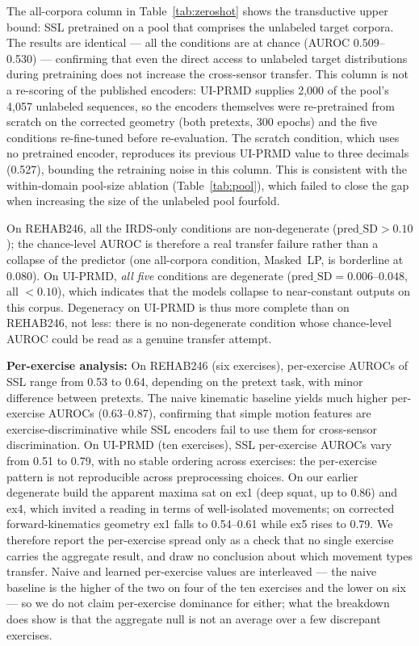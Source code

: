\documentclass[10pt,journal]{IEEEtran}
\begin{document}
The all-corpora column in Table~\ref{tab:zeroshot} shows the transductive upper bound: SSL pretrained on a pool that comprises the unlabeled target corpora. The results are identical --- all the conditions are at chance (AUROC 0.509--0.530) --- confirming that even the direct access to unlabeled target distributions during pretraining does not increase the cross-sensor transfer. This column is not a re-scoring of the published encoders: UI-PRMD supplies 2{,}000 of the pool's 4{,}057 unlabeled sequences, so the encoders themselves were re-pretrained from scratch on the corrected geometry (both pretexts, 300 epochs) and the five conditions re-fine-tuned before re-evaluation. The scratch condition, which uses no pretrained encoder, reproduces its previous UI-PRMD value to three decimals (0.527), bounding the retraining noise in this column. This is consistent with the within-domain pool-size ablation (Table~\ref{tab:pool}), which failed to close the gap when increasing the size of the unlabeled pool fourfold.

On REHAB246, all the IRDS-only conditions are non-degenerate ($\text{pred\_SD} > 0.10$); the chance-level AUROC is therefore a real transfer failure rather than a collapse of the predictor (one all-corpora condition, Masked~LP, is borderline at $0.080$). On UI-PRMD, \emph{all five} conditions are degenerate ($\text{pred\_SD} = 0.006$--$0.048$, all $< 0.10$), which indicates that the models collapse to near-constant outputs on this corpus. Degeneracy on UI-PRMD is thus more complete than on REHAB246, not less: there is no non-degenerate condition whose chance-level AUROC could be read as a genuine transfer attempt.

\textbf{Per-exercise analysis:} On REHAB246 (six exercises), per-exercise AUROCs of SSL range from 0.53 to 0.64, depending on the pretext task, with minor difference between pretexts. The naive kinematic baseline yields much higher per-exercise AUROCs (0.63--0.87), confirming that simple motion features are exercise-discriminative while SSL encoders fail to use them for cross-sensor discrimination. On UI-PRMD (ten exercises), SSL per-exercise AUROCs vary from 0.51 to 0.79, with no stable ordering across exercises: the per-exercise pattern is not reproducible across preprocessing choices. On our earlier degenerate build the apparent maxima sat on ex1 (deep squat, up to 0.86) and ex4, which invited a reading in terms of well-isolated movements; on corrected forward-kinematics geometry ex1 falls to 0.54--0.61 while ex5 rises to 0.79. We therefore report the per-exercise spread only as a check that no single exercise carries the aggregate result, and draw no conclusion about which movement types transfer. Naive and learned per-exercise values are interleaved --- the naive baseline is the higher of the two on four of the ten exercises and the lower on six --- so we do not claim per-exercise dominance for either; what the breakdown does show is that the aggregate null is not an average over a few discrepant exercises.
\end{document}
